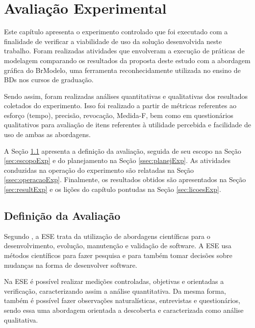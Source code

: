\chapter{Avaliação Experimental}\label{validacaoProposta}
Este capítulo apresenta o experimento controlado que foi executado com a finalidade de verificar a viabilidade de uso da solução desenvolvida neste trabalho. 
Foram realizadas atividades que envolveram a execução de práticas de modelagem comparando os resultados da proposta deste estudo com a abordagem gráfica do BrModelo, uma ferramenta reconhecidamente utilizada no ensino de \acp{BD} nos cursos de graduação.

Sendo assim, foram realizadas análises quantitativas e qualitativas dos resultados coletados do experimento. 
Isso foi realizado a partir de métricas referentes ao esforço (tempo), precisão, revocação, Medida-F, bem como em questionários qualitativos para avaliação de itens referentes à utilidade percebida e facilidade de uso de ambas as abordagens.

A Seção \ref{sec:defExp} apresenta a definição da avaliação, seguida de seu escopo na Seção \ref{sec:escopoExp} e do planejamento na Seção \ref{ssec:planejExp}.
As atividades conduzidas na operação do experimento são relatadas na Seção \ref{ssec:operacaoExp}.
Finalmente, os resultados obtidos são apresentados na Seção \ref{sec:resultExp} e os lições do capítulo pontudas na Seção \ref{sec:licoesExp}.

\section{Definição da Avaliação} \label{sec:defExp}
Segundo , a \ac{ESE} trata da utilização de abordagens científicas para o desenvolvimento, evolução, manutenção e validação de software. 
A \ac{ESE} usa métodos científicos para fazer pesquisa e para também tomar decisões sobre mudanças na forma de desenvolver software.

Na \ac{ESE} é possível realizar medições controladas, objetivas e orientadas a verificação, caracterizando assim a análise quantitativa. 
Da mesma forma, também é possível fazer observações naturalísticas, entrevistas e questionários, sendo essa uma abordagem orientada a descoberta e caracterizada como análise qualitativa.

